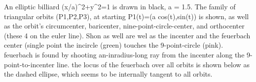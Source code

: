 An elliptic billiard (x/a)^2+y^2=1 is drawn in black, a = 1.5. The family of triangular orbits (P1,P2,P3), at starting P1(t)=(a cos(t),sin(t)) is shown, as well as the orbit's circumcenter, baricenter, nine-point-circle-center, and orthocenter (these 4 on the euler line). Shon as well are  wel as the incenter and the feuerbach center (single point the incircle (green) touches the 9-point-circle (pink). feuerbach is found by shooting an-inradius-long ray from the incenter along the 9-point-to-incenter line. the locus of the feuerbach over all orbits is shown below as the dashed ellipse, which seems to be internally tangent to all orbits.
